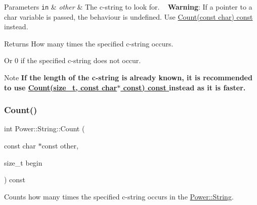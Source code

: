 \begin{DoxyParams}[1]{Parameters}
\mbox{\tt in}  & {\em other} & The c-\/string to look for. ~\newline
 {\bfseries Warning}\+: If a pointer to a char variable is passed, the behaviour is undefined. Use \hyperlink{class_power_1_1_string_a55085e218917bb734a53c150cb7b9d1e}{Count(const char) const }instead. \\
\hline
\end{DoxyParams}
\begin{DoxyReturn}{Returns}
How many times the specified c-\/string occurs. 

Or 0 if the specified c-\/string does not occur. 
\end{DoxyReturn}
\begin{DoxyNote}{Note}
{\bfseries If the length of the c-\/string is already known, it is recommended to use \hyperlink{class_power_1_1_string_af5bacafb26ee473157898f3422f8c24a}{Count(size\+\_\+t, const char$\ast$ const) const }instead as it is faster.} 
\end{DoxyNote}
\mbox{\label{class_power_1_1_string_ad68048bd773411926894154779f287e8}} 
\subsubsection{\texorpdfstring{Count()}{Count()}\hspace{0.1cm}{\footnotesize\ttfamily [5/12]}}
{\footnotesize\ttfamily int Power\+::\+String\+::\+Count (\begin{DoxyParamCaption}\item[{const char $\ast$const}]{other,  }\item[{size\+\_\+t}]{begin }\end{DoxyParamCaption}) const\hspace{0.3cm}{\ttfamily [inline]}}



Counts how many times the specified c-\/string occurs in the \hyperlink{class_power_1_1_string}{Power\+::\+String}. 


